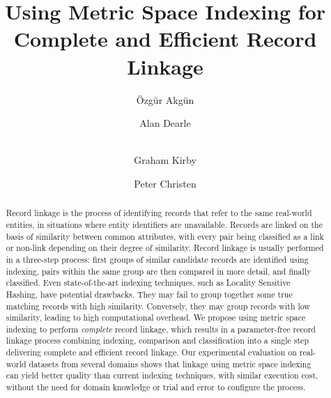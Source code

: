 \documentclass{llncs}
\begin{document}
       
\title{Using Metric Space Indexing for Complete and Efficient Record Linkage}


\author{{\"O}zg{\"u}r Akg{\"u}n \and Alan Dearle \and\\
Graham Kirby \and Peter Christen}

      

\maketitle

\begin{abstract}

Record linkage is the process of identifying records that refer to the
same real-world entities, in situations where entity identifiers are
unavailable. Records are linked on the basis of similarity between
common attributes, with every pair being classified as a link or
non-link depending on their degree of similarity. Record linkage is
usually performed in a three-step process: first groups of similar
candidate records are identified using indexing, pairs within the same
group are then compared in more detail, and finally classified.
%
Even state-of-the-art indexing techniques, such as Locality Sensitive
Hashing, have potential drawbacks. They may fail to group together some
true matching records with high similarity. Conversely, they may group
records with low similarity, leading to high computational overhead.
%
We propose using metric space indexing to perform \emph{complete} record
linkage, which results in a parameter-free record linkage process
combining indexing, comparison and classification into a single step
delivering complete and efficient record linkage. Our experimental
evaluation on real-world datasets from several domains shows that
linkage using metric space indexing can yield better quality than
current indexing techniques, with similar execution cost, without the
need for domain knowledge or trial and error to configure the process.

\end{abstract}
\end{document}
